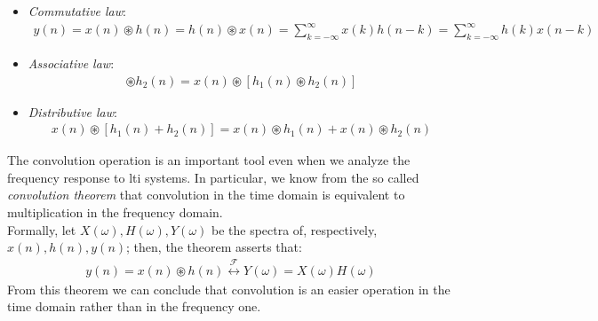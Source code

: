 \begin{itemize}
	\item \textit{Commutative law}:
	\begin{align} 
		y(n) = x(n) \circledast h(n) = h(n) \circledast x(n) = \sum_{k = - \infty}^{\infty}x(k)h(n-k) = \sum_{k = - \infty}^{\infty}h(k)x(n-k)
	\end{align}
	\item \textit{Associative law}:
	\begin{align}
		[x(n) \circledast h_1(n)] \circledast h_2(n) = x(n) \circledast [h_1(n) \circledast h_2(n)]
	\end{align}
	\item \textit{Distributive law}:
	\begin{align}
		x(n) \circledast [h_1(n) + h_2(n)] = x(n) \circledast h_1(n) +  x(n) \circledast h_2(n)
	\end{align}
\end{itemize}
\noindent The convolution operation is an important tool even when we analyze the frequency response to \gls{lti} systems. In particular, we know from the so called \textit{convolution theorem} that convolution in the time domain is equivalent to multiplication in the frequency domain. \\
Formally, let $X(\omega), H(\omega), Y(\omega)$ be the spectra of, respectively, $x(n), h(n), y(n)$; then, the theorem asserts that:
\begin{align} \label{conv_theorem}
	y(n)=x(n) \circledast  h(n) \stackrel{\mathscr{F}}{\longleftrightarrow} Y(\omega)=X(\omega) H(\omega)
\end{align}
\noindent From this theorem we can conclude that convolution is an easier operation in the time domain rather than in the frequency one. \\


